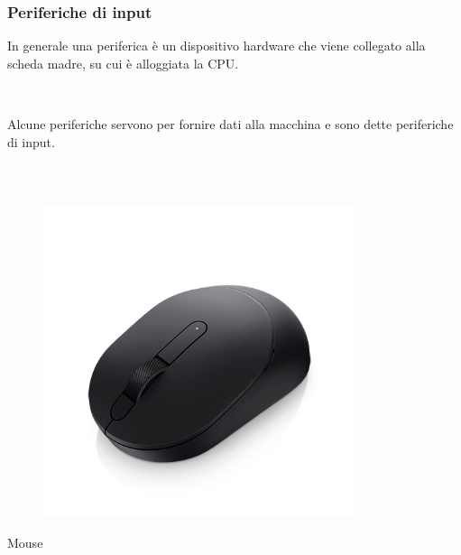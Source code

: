 \documentclass[handout]{beamer}
\begin{document}
\begin{frame}
\frametitle{Periferiche di input}
In generale una \alert<1>{periferica} è un dispositivo hardware che viene collegato alla scheda madre, su cui è alloggiata la CPU.

~

Alcune periferiche servono per \alert<1>{fornire dati alla macchina} e sono dette periferiche di input.

~

\begin{columns}
\begin{column}{.22\textwidth}
  \begin{center}
  \begin{figure}
    \includegraphics[width=\columnwidth]{img/mouse.jpg}
  \end{figure}
  Mouse
  \end{center}
\end{column}
\begin{column}{.22\textwidth}
  \begin{center}
    \begin{figure}

\end{figure}
\end{center}
\end{column}
\end{columns}
\end{frame}
\end{document}
